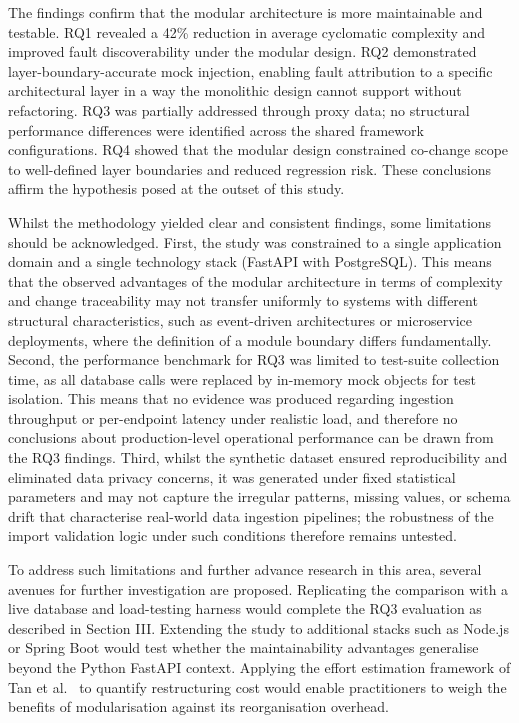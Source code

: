 \documentclass[conference]{IEEEtran}
\begin{document}
The findings confirm that the modular architecture is more maintainable and testable. RQ1 revealed a 42\% reduction in average cyclomatic complexity and improved fault discoverability under the modular design. RQ2 demonstrated layer-boundary-accurate mock injection, enabling fault attribution to a specific architectural layer in a way the monolithic design cannot support without refactoring. RQ3 was partially addressed through proxy data; no structural performance differences were identified across the shared framework configurations. RQ4 showed that the modular design constrained co-change scope to well-defined layer boundaries and reduced regression risk. These conclusions affirm the hypothesis posed at the outset of this study.

Whilst the methodology yielded clear and consistent findings, some limitations should be acknowledged. First, the study was constrained to a single application domain and a single technology stack (FastAPI with PostgreSQL). This means that the observed advantages of the modular architecture in terms of complexity and change traceability may not transfer uniformly to systems with different structural characteristics, such as event-driven architectures or microservice deployments, where the definition of a module boundary differs fundamentally. Second, the performance benchmark for RQ3 was limited to test-suite collection time, as all database calls were replaced by in-memory mock objects for test isolation. This means that no evidence was produced regarding ingestion throughput or per-endpoint latency under realistic load, and therefore no conclusions about production-level operational performance can be drawn from the RQ3 findings. Third, whilst the synthetic dataset ensured reproducibility and eliminated data privacy concerns, it was generated under fixed statistical parameters and may not capture the irregular patterns, missing values, or schema drift that characterise real-world data ingestion pipelines; the robustness of the import validation logic under such conditions therefore remains untested.

To address such limitations and further advance research in this area, several avenues for further investigation are proposed. Replicating the comparison with a live database and load-testing harness would complete the RQ3 evaluation as described in Section III. Extending the study to additional stacks such as Node.js or Spring Boot would test whether the maintainability advantages generalise beyond the Python FastAPI context. Applying the effort estimation framework of Tan et al.\ \cite{b2} to quantify restructuring cost would enable practitioners to weigh the benefits of modularisation against its reorganisation overhead.
\end{document}
